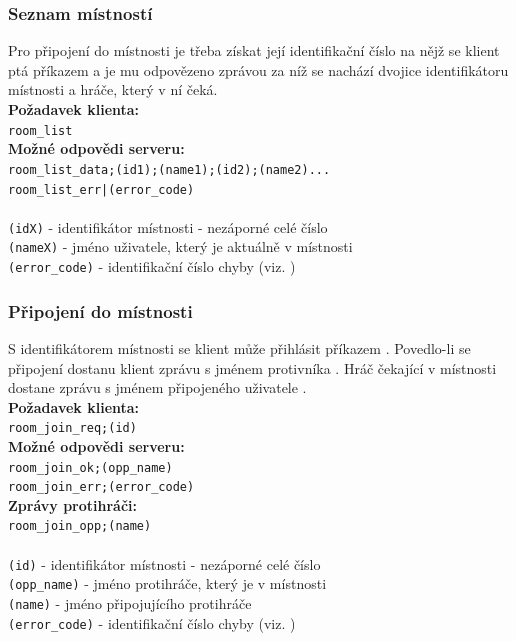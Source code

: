 \documentclass[12pt, a4paper]{article} %
\begin{document}
	\subsubsection{Seznam místností}
	\par Pro připojení do místnosti je třeba získat její identifikační číslo na nějž se klient ptá příkazem  a je mu odpovězeno zprávou  za níž se nachází dvojice identifikátoru místnosti a hráče, který v ní čeká.\\	
	\textbf{Požadavek klienta:}\\
	\texttt{room\_list}\\
	\textbf{Možné odpovědi serveru:}\\
	\texttt{room\_list\_data;(id1);(name1);(id2);(name2)...}\\
	\texttt{room\_list\_err|(error\_code)}\\\\
	\texttt{(idX)} - identifikátor místnosti - nezáporné celé číslo\\
	\texttt{(nameX)} - jméno uživatele, který je aktuálně v místnosti\\
	\texttt{(error\_code)} - identifikační číslo chyby (viz. )
	
	
	\subsubsection{Připojení do místnosti}
	\par S identifikátorem místnosti se klient může přihlásit příkazem . Povedlo-li se připojení dostanu klient zprávu s jménem protivníka .  Hráč čekající v místnosti dostane zprávu s jménem připojeného uživatele .\\	
	\textbf{Požadavek klienta:}\\
	\texttt{room\_join\_req;(id)}\\
	\textbf{Možné odpovědi serveru:}\\
	\texttt{room\_join\_ok;(opp\_name)}\\
	\texttt{room\_join\_err;(error\_code)}\\
	\textbf{Zprávy protihráči:}\\
	\texttt{room\_join\_opp;(name)}\\\\
	\texttt{(id)} - identifikátor místnosti - nezáporné celé číslo\\
	\texttt{(opp\_name)} - jméno protihráče, který je v místnosti\\
	\texttt{(name)} - jméno připojujícího protihráče\\
	\texttt{(error\_code)} - identifikační číslo chyby (viz. )
\end{document}
